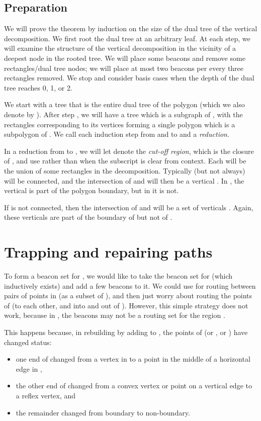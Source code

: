 \documentclass{article}
\begin{document}
		
\subsection{Preparation}
	We will prove the theorem by induction on the size of the dual tree of the
	vertical decomposition.
	We first root the dual tree at an arbitrary leaf.
	At each step, we will examine the structure of the vertical decomposition
	in the vicinity of a deepest node in the rooted tree. 
	We will place some beacons and remove some
	rectangles/dual tree nodes;
	we will place at most two beacons per every three rectangles removed.
	We stop and consider basis cases when the depth of the dual tree reaches
	0, 1, or 2.
	
	We start with a tree  that is the entire dual tree
	of the polygon  (which we also denote by ).
	After step , we will have a tree  which is a subgraph of ,
	with the rectangles corresponding to its vertices forming a 
	single polygon  which is a subpolygon of .
	We call each induction step from  and  to  and  a
	\emph{reduction}.
	
	In a reduction from  to , we will let  denote the
	\emph{cut-off region}, which is the closure of ,
	and use  rather than  when the subscript is clear from context.
	Each  will be the union of some rectangles in the
	decomposition.
	Typically (but not always)  will be connected, and the intersection of
	 and  will then be a vertical .
	In , the vertical  is part of the polygon boundary, but in  it
	is not.
	
	If  is not connected, then the intersection of  and 
	will be a set of verticals .  Again, these verticals are part of
	the boundary of  but not of .
	 



\section{Trapping and repairing paths}\label{sec:repair} 

	To form a beacon set  for , we would like to take the beacon set
	 for  (which inductively exists) and add a few beacons to it.
	We could use  for routing between pairs of points in  (as a
	subset of ), and then just worry about routing the points of  (to
	each other, and into and out of ).  However, this simple strategy does not work,
	because in , the beacons  may not be a routing set for the region
	.
	
	This happens because, in rebuilding  by adding  to ,
	the points of  (or , or ) have changed status:
	\begin{itemize}
	\item one end of  changed from a vertex in  to a point in the
		middle of a horizontal edge in ,
	\item the other end of  changed from a convex vertex or point on a
		vertical edge to a reflex vertex, and
	\item the remainder changed from boundary to non-boundary.
	\end{itemize}
	
\end{document}
